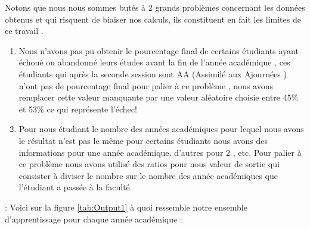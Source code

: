  Notons que nous nous sommes butés à 2 grands problèmes concernant les
 données obtenus et qui risquent de biaiser nos calculs,  ils constituent en fait les limites de ce travail . 
 \begin{enumerate}
 	\item Nous n'avons
 	pas pu obtenir le pourcentage final de certains étudiants ayant échoué
 	ou abandonné leurs études avant la fin de l'année académique , ces
 	étudiants qui après la seconde session sont AA (Assimilé aux Ajournées )
 	n'ont pas de pourcentage final pour palier à ce problème , nous avons
 	remplacer cette valeur manquante par une valeur aléatoire choisie entre
 	45\% et 53\%   ce qui représente l'échec!
 	\item  Pour nous étudiant le
 	nombre des années académiques pour lequel nous avons le résultat n'est
 	pas le même pour certains étudiants nous avons des informations pour une 
 	année académique, d'autres pour 2 , etc. Pour palier à ce problème nous
 	avons utilisé des ratios pour nous valeur de sortie qui consister à
 	diviser le nombre sur le nombre des année académiques que l'étudiant a
 	passée à la faculté.
 \end{enumerate}:
  Voici sur la figure \ref{tab:Output1} à  quoi ressemble notre ensemble d'apprentissage pour chaque année académique :
